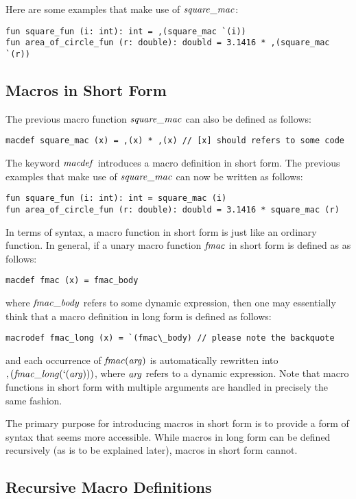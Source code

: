 Here are some examples that make use of ${\it square\_mac}$:
\begin{verbatim}
fun square_fun (i: int): int = ,(square_mac `(i))
fun area_of_circle_fun (r: double): doubld = 3.1416 * ,(square_mac `(r))
\end{verbatim}

\subsection{Macros in Short Form}
The previous macro function ${\it square\_mac}$ can also be defined as
follows:
\begin{verbatim}
macdef square_mac (x) = ,(x) * ,(x) // [x] should refers to some code
\end{verbatim}

The keyword ${\it macdef}$ introduces a macro definition in short form.
The previous examples that make use of ${\it square\_mac}$ can now be
written as follows:
\begin{verbatim}
fun square_fun (i: int): int = square_mac (i)
fun area_of_circle_fun (r: double): doubld = 3.1416 * square_mac (r)
\end{verbatim}

In terms of syntax, a macro function in short form is just like an ordinary
function.  In general, if a unary macro function ${\it fmac}$ in short
form is defined as as follows:
\begin{verbatim}
macdef fmac (x) = fmac_body
\end{verbatim}
where ${\it fmac\_body}$ refers to some dynamic expression, then one may
essentially think that a macro definition in long form is defined as
follows:
\begin{verbatim}
macrodef fmac_long (x) = `(fmac\_body) // please note the backquote
\end{verbatim}
and each occurrence of ${\it fmac}({\it arg})$ is automatically rewritten
into $,({\it fmac\_long}(`({\it arg})))$, where ${\it arg}$ refers to a
dynamic expression. Note that macro functions in short form with multiple
arguments are handled in precisely the same fashion.

The primary purpose for introducing macros in short form is to provide a
form of syntax that seems more accessible. While macros in long form can be
defined recursively (as is to be explained later), macros in short form
cannot.

\subsection{Recursive Macro Definitions}



